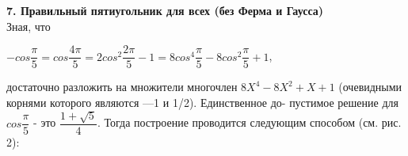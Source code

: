 
\noindent\textbf{7. Правильный пятиугольник для всех (без Ферма и Гаусса)}\\

Зная, что
\begin{center}
$-cos\dfrac{\pi}{5}=cos\dfrac{4\pi}{5}=2cos^2\dfrac{2\pi}{5}-1=8cos^4\dfrac{\pi}{5}-8cos^2\dfrac{\pi}{5}+1$,
\end{center}
достаточно разложить на множители многочлен $8X^4-8X^2+X+1$\linebreak
(очевидными корнями которого являются —1 и 1/2). Единственное до-\linebreak
пустимое решение для $cos\dfrac{\pi}{5}$ - это $\dfrac{1+\sqrt{5}}{4}$. Тогда построение проводится\linebreak
следующим способом (см. рис. 2):\\

